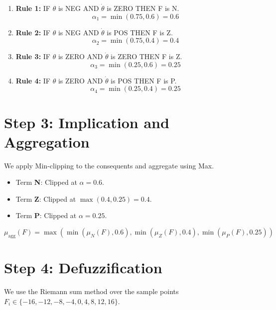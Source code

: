 \documentclass{article}
\begin{document}
\begin{enumerate}
    \item \textbf{Rule 1:} IF $\theta$ is NEG AND $\dot{\theta}$ is ZERO THEN F is N.
    \[ \alpha_1 = \min(0.75, 0.6) = 0.6 \]
    
    \item \textbf{Rule 2:} IF $\theta$ is NEG AND $\dot{\theta}$ is POS THEN F is Z.
    \[ \alpha_2 = \min(0.75, 0.4) = 0.4 \]
    
    \item \textbf{Rule 3:} IF $\theta$ is ZERO AND $\dot{\theta}$ is ZERO THEN F is Z.
    \[ \alpha_3 = \min(0.25, 0.6) = 0.25 \]
    
    \item \textbf{Rule 4:} IF $\theta$ is ZERO AND $\dot{\theta}$ is POS THEN F is P.
    \[ \alpha_4 = \min(0.25, 0.4) = 0.25 \]
\end{enumerate}

\section{Step 3: Implication and Aggregation}
We apply Min-clipping to the consequents and aggregate using Max.

\begin{itemize}
    \item Term \textbf{N}: Clipped at $\alpha = 0.6$.
    \item Term \textbf{Z}: Clipped at $\max(0.4, 0.25) = 0.4$.
    \item Term \textbf{P}: Clipped at $\alpha = 0.25$.
\end{itemize}

\[ \mu_{\text{agg}}(F) = \max \left( \min(\mu_N(F), 0.6), \min(\mu_Z(F), 0.4), \min(\mu_P(F), 0.25) \right) \]

\section{Step 4: Defuzzification}
We use the Riemann sum method over the sample points $F_i \in \{-16, -12, -8, -4, 0, 4, 8, 12, 16\}$.
\end{document}
